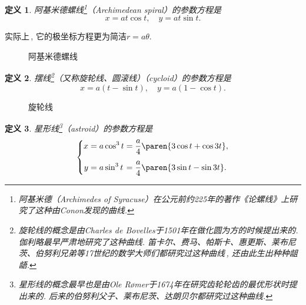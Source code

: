 \documentclass[a4paper,punct=CCT]{ctexbook}
\theoremstyle{break}
\newtheorem*{definition*}{定义}
\begin{document}
\begin{definition*}
  阿基米德螺线\footnote{阿基米德（Archimedes of Syracuse）在公元前约225年的著作《论螺线》上研究了这种由Conon发现的曲线.}（Archimedean spiral）的参数方程是
  \[
    x = at \cos t, \quad y = at \sin t.
  \]
\end{definition*}

实际上\,, 它的极坐标方程更为简洁\(r = a \theta\).

\begin{figure}[H]
  \centering
  \caption*{阿基米德螺线}
\end{figure}

\begin{definition*}
  摆线\footnote{旋轮线的概念是由Charles de Bovelles于1501年在做化圆为方的时候提出来的.  伽利略最早严肃地研究了这种曲线. 笛卡尔、费马、帕斯卡、惠更斯、莱布尼茨、伯努利兄弟等17世纪的数学大师们都研究过这种曲线\,, 还由此生出种种龃龉.}（又称旋轮线、圆滚线）（cycloid）的参数方程是
  \[
    x = a (t - \sin t), \quad y = a (1 - \cos t).
  \]
\end{definition*}

\begin{figure}[H]
  \centering
  \caption*{旋轮线}
\end{figure}

\begin{definition*}
  星形线\footnote{星形线的概念最早也是由Ole Rømer于1674年在研究齿轮轮齿的最优形状时提出来的.  后来的伯努利父子、莱布尼茨、达朗贝尔都研究过这种曲线.}（astroid）的参数方程是
  \[
    \left\{
      \addtolength{\jot}{1ex}
      \begin{alignedat}{2}
        x &= a \cos^3 t &&= \frac a4 \paren{3 \cos t + \cos 3t}, \\
        y &= a \sin^3 t &&= \frac a4 \paren{3 \sin t - \sin 3t}.
      \end{alignedat}
    \right.
  \]
\end{definition*}
\pagebreak
\end{document}
